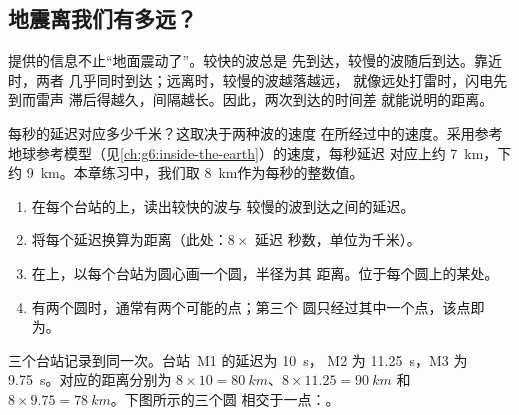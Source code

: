 \subsection*{地震离我们有多远？}

提供的信息不止“地面震动了”。较快的波总是
先到达，较慢的波随后到达。靠近时，两者
几乎同时到达；远离时，较慢的波越落越远，
就像远处打雷时，闪电先到而雷声
滞后得越久，间隔越长。因此，两次到达的时间差
就能说明的距离。

每秒的延迟对应多少千米？这取决于两种波的速度
在所经过中的速度。采用参考
地球参考模型（见\cref{ch:g6:inside-the-earth}）的速度，每秒延迟
对应上约 \qty{7}{km}，下
约 \qty{9}{km}。本章练习中，我们取
\qty{8}{km}作为每秒的整数值。

\begin{method}[用三个台站确定震中]\label{met:g7:earthquakes:three-circles}
\begin{enumerate}
  \item 在每个台站的上，读出较快的波与
        较慢的波到达之间的延迟。
  \item 将每个延迟换算为距离（此处：$8 \times$ 延迟
        秒数，单位为千米）。
  \item 在上，以每个台站为圆心画一个圆，半径为其
        距离。位于每个圆上的某处。
  \item 有两个圆时，通常有两个可能的点；第三个
        圆只经过其中一个点，该点即为。
\end{enumerate}
\end{method}

\begin{example}[三个圆]\label{ex:g7:earthquakes:three-circles}
三个台站记录到同一次。台站~M1 的延迟为 \qty{10}{s}，
M2 为 \qty{11.25}{s}，M3 为 \qty{9.75}{s}。对应的距离分别为
$8 \times 10 = \qty{80}{km}$、$8 \times 11.25 = \qty{90}{km}$ 和
$8 \times 9.75 = \qty{78}{km}$。下图所示的三个圆
相交于一点：。
\end{example}


